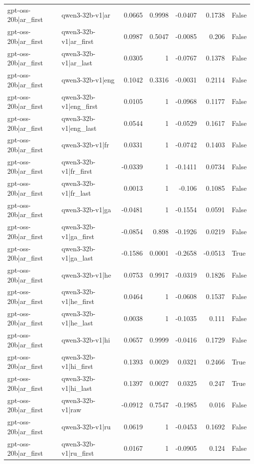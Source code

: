\begin{table}
\begin{tabular}{l l r r r r l}
gpt-oss-20b|ar_first & qwen3-32b-v1|ar & 0.0665 & 0.9998 & -0.0407 & 0.1738 & False \\
gpt-oss-20b|ar_first & qwen3-32b-v1|ar_first & 0.0987 & 0.5047 & -0.0085 & 0.206 & False \\
gpt-oss-20b|ar_first & qwen3-32b-v1|ar_last & 0.0305 & 1 & -0.0767 & 0.1378 & False \\
gpt-oss-20b|ar_first & qwen3-32b-v1|eng & 0.1042 & 0.3316 & -0.0031 & 0.2114 & False \\
gpt-oss-20b|ar_first & qwen3-32b-v1|eng_first & 0.0105 & 1 & -0.0968 & 0.1177 & False \\
gpt-oss-20b|ar_first & qwen3-32b-v1|eng_last & 0.0544 & 1 & -0.0529 & 0.1617 & False \\
gpt-oss-20b|ar_first & qwen3-32b-v1|fr & 0.0331 & 1 & -0.0742 & 0.1403 & False \\
gpt-oss-20b|ar_first & qwen3-32b-v1|fr_first & -0.0339 & 1 & -0.1411 & 0.0734 & False \\
gpt-oss-20b|ar_first & qwen3-32b-v1|fr_last & 0.0013 & 1 & -0.106 & 0.1085 & False \\
gpt-oss-20b|ar_first & qwen3-32b-v1|ga & -0.0481 & 1 & -0.1554 & 0.0591 & False \\
gpt-oss-20b|ar_first & qwen3-32b-v1|ga_first & -0.0854 & 0.898 & -0.1926 & 0.0219 & False \\
gpt-oss-20b|ar_first & qwen3-32b-v1|ga_last & -0.1586 & 0.0001 & -0.2658 & -0.0513 & True \\
gpt-oss-20b|ar_first & qwen3-32b-v1|he & 0.0753 & 0.9917 & -0.0319 & 0.1826 & False \\
gpt-oss-20b|ar_first & qwen3-32b-v1|he_first & 0.0464 & 1 & -0.0608 & 0.1537 & False \\
gpt-oss-20b|ar_first & qwen3-32b-v1|he_last & 0.0038 & 1 & -0.1035 & 0.111 & False \\
gpt-oss-20b|ar_first & qwen3-32b-v1|hi & 0.0657 & 0.9999 & -0.0416 & 0.1729 & False \\
gpt-oss-20b|ar_first & qwen3-32b-v1|hi_first & 0.1393 & 0.0029 & 0.0321 & 0.2466 & True \\
gpt-oss-20b|ar_first & qwen3-32b-v1|hi_last & 0.1397 & 0.0027 & 0.0325 & 0.247 & True \\
gpt-oss-20b|ar_first & qwen3-32b-v1|raw & -0.0912 & 0.7547 & -0.1985 & 0.016 & False \\
gpt-oss-20b|ar_first & qwen3-32b-v1|ru & 0.0619 & 1 & -0.0453 & 0.1692 & False \\
gpt-oss-20b|ar_first & qwen3-32b-v1|ru_first & 0.0167 & 1 & -0.0905 & 0.124 & False \\

\end{tabular}
\end{table}
